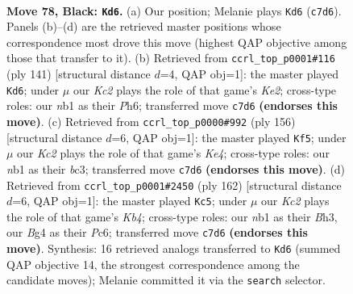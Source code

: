 \documentclass[11pt]{article}
\begin{document}
\clearpage

\begin{figure}[p]\centering
\begin{subfigure}{0.46\textwidth}\centering
\resizebox{\linewidth}{!}{%
\newchessgame
\chessboard[
  setfen={8/2k5/5B2/8/p1p3b1/8/5K2/1N6 b - - 11 78},
  showmover=false,
  pgfstyle=straightmove, color=movearrow, markmove={c7-d6}
]}
\caption{}
\end{subfigure}\hfill
\begin{subfigure}{0.46\textwidth}\centering
\resizebox{\linewidth}{!}{%
\newchessgame
\chessboard[
  setfen={8/4k3/7p/7P/1p2K3/1B6/1b6/8 b - - 0 71},
  showmover=false,
  pgfstyle=straightmove, color=movearrow, markmove={e7-d6}
]}
\caption{}
\end{subfigure}
\\[4pt]
\begin{subfigure}{0.46\textwidth}\centering
\resizebox{\linewidth}{!}{%
\newchessgame
\chessboard[
  setfen={5k2/8/6PP/8/4K3/1Bb5/8/8 w - - 1 79},
  showmover=false,
  pgfstyle=straightmove, color=movearrow, markmove={e4-f5}
]}
\caption{}
\end{subfigure}\hfill
\begin{subfigure}{0.46\textwidth}\centering
\resizebox{\linewidth}{!}{%
\newchessgame
\chessboard[
  setfen={8/2b1k3/2P5/8/1K5p/7B/8/8 w - - 9 82},
  showmover=false,
  pgfstyle=straightmove, color=movearrow, markmove={b4-c5}
]}
\caption{}
\end{subfigure}
\caption{\textbf{Move 78, Black: \texttt{Kd6}.} (a) Our position; Melanie plays \texttt{Kd6} (\texttt{c7d6}). Panels (b)--(d) are the retrieved master positions whose correspondence most drove this move (highest QAP objective among those that transfer to it). (b) Retrieved from \texttt{ccrl\_top\_p0001\#116} (ply 141) [structural distance $d$=4, QAP obj=1]: the master played \texttt{Kd6}; under $\mu$ our \emph{Kc2} plays the role of that game's \emph{Ke2}; cross-type roles: our \emph{n}b1 as their \emph{P}h6; transferred move \texttt{c7d6} \textbf{(endorses this move)}. (c) Retrieved from \texttt{ccrl\_top\_p0000\#992} (ply 156) [structural distance $d$=6, QAP obj=1]: the master played \texttt{Kf5}; under $\mu$ our \emph{Kc2} plays the role of that game's \emph{Ke4}; cross-type roles: our \emph{n}b1 as their \emph{b}c3; transferred move \texttt{c7d6} \textbf{(endorses this move)}. (d) Retrieved from \texttt{ccrl\_top\_p0001\#2450} (ply 162) [structural distance $d$=6, QAP obj=1]: the master played \texttt{Kc5}; under $\mu$ our \emph{Kc2} plays the role of that game's \emph{Kb4}; cross-type roles: our \emph{n}b1 as their \emph{B}h3, our \emph{B}g4 as their \emph{P}c6; transferred move \texttt{c7d6} \textbf{(endorses this move)}. Synthesis: 16 retrieved analogs transferred to \texttt{Kd6} (summed QAP objective 14, the strongest correspondence among the candidate moves); Melanie committed it via the \texttt{search} selector.}
\label{fig:thought-m155}
\end{figure}
\end{document}
